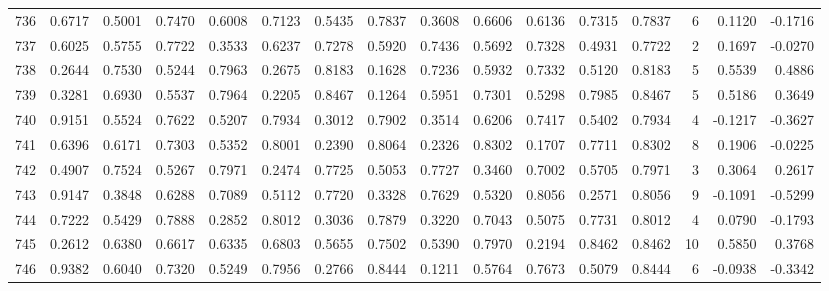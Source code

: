 \begin{tabular}{lrrrrrrrrrrrrrrr}
736 &      0.6717 &  0.5001 &  0.7470 &  0.6008 &  0.7123 &  0.5435 &  0.7837 &  0.3608 &  0.6606 &  0.6136 &   0.7315 &     0.7837 &      6 &                    0.1120 &                    -0.1716 \\
737 &      0.6025 &  0.5755 &  0.7722 &  0.3533 &  0.6237 &  0.7278 &  0.5920 &  0.7436 &  0.5692 &  0.7328 &   0.4931 &     0.7722 &      2 &                    0.1697 &                    -0.0270 \\
738 &      0.2644 &  0.7530 &  0.5244 &  0.7963 &  0.2675 &  0.8183 &  0.1628 &  0.7236 &  0.5932 &  0.7332 &   0.5120 &     0.8183 &      5 &                    0.5539 &                     0.4886 \\
739 &      0.3281 &  0.6930 &  0.5537 &  0.7964 &  0.2205 &  0.8467 &  0.1264 &  0.5951 &  0.7301 &  0.5298 &   0.7985 &     0.8467 &      5 &                    0.5186 &                     0.3649 \\
740 &      0.9151 &  0.5524 &  0.7622 &  0.5207 &  0.7934 &  0.3012 &  0.7902 &  0.3514 &  0.6206 &  0.7417 &   0.5402 &     0.7934 &      4 &                   -0.1217 &                    -0.3627 \\
741 &      0.6396 &  0.6171 &  0.7303 &  0.5352 &  0.8001 &  0.2390 &  0.8064 &  0.2326 &  0.8302 &  0.1707 &   0.7711 &     0.8302 &      8 &                    0.1906 &                    -0.0225 \\
742 &      0.4907 &  0.7524 &  0.5267 &  0.7971 &  0.2474 &  0.7725 &  0.5053 &  0.7727 &  0.3460 &  0.7002 &   0.5705 &     0.7971 &      3 &                    0.3064 &                     0.2617 \\
743 &      0.9147 &  0.3848 &  0.6288 &  0.7089 &  0.5112 &  0.7720 &  0.3328 &  0.7629 &  0.5320 &  0.8056 &   0.2571 &     0.8056 &      9 &                   -0.1091 &                    -0.5299 \\
744 &      0.7222 &  0.5429 &  0.7888 &  0.2852 &  0.8012 &  0.3036 &  0.7879 &  0.3220 &  0.7043 &  0.5075 &   0.7731 &     0.8012 &      4 &                    0.0790 &                    -0.1793 \\
745 &      0.2612 &  0.6380 &  0.6617 &  0.6335 &  0.6803 &  0.5655 &  0.7502 &  0.5390 &  0.7970 &  0.2194 &   0.8462 &     0.8462 &     10 &                    0.5850 &                     0.3768 \\
746 &      0.9382 &  0.6040 &  0.7320 &  0.5249 &  0.7956 &  0.2766 &  0.8444 &  0.1211 &  0.5764 &  0.7673 &   0.5079 &     0.8444 &      6 &                   -0.0938 &                    -0.3342 \\

\end{tabular}
